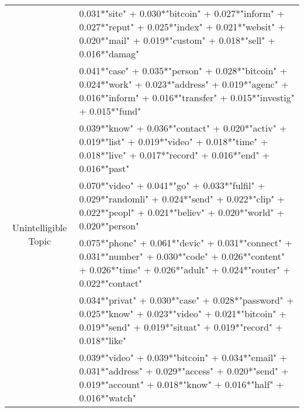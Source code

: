 \begin{table*}[]
\begin{tabularx}{\textwidth}{|c|X|}
& 0.031*"site" + 0.030*"bitcoin" + 0.027*"inform" + 0.027*"reput" + 0.025*"index" + 0.021*"websit" + 0.020*"mail" + 0.019*"custom" + 0.018*"sell" + 0.016*"damag" \\ \cline{2-2}
&  0.041*"case" + 0.035*"person" + 0.028*"bitcoin" + 0.024*"work" + 0.023*"address" + 0.019*"agenc" + 0.016*"inform" + 0.016*"transfer" + 0.015*"investig" + 0.015*"fund" 
\\ \hline                     
\multirow{4}{*}{Unintelligible Topic} & 0.039*"know" + 0.036*"contact" + 0.020*"activ" + 0.019*"list" + 0.019*"video" + 0.018*"time" + 0.018*"live" + 0.017*"record" + 0.016*"end" + 0.016*"past"\\ \cline{2-2}
&  0.070*"video" + 0.041*"go" + 0.033*"fulfil" + 0.029*"randomli" + 0.024*"send" + 0.022*"clip" + 0.022*"peopl" + 0.021*"believ" + 0.020*"world" + 0.020*"person"\\ \cline{2-2}
& 0.075*"phone" + 0.061*"devic" + 0.031*"connect" + 0.031*"number" + 0.030*"code" + 0.026*"content" + 0.026*"time" + 0.026*"adult" + 0.024*"router" + 0.022*"contact"\\ \cline{2-2}
& 0.034*"privat" + 0.030*"case" + 0.028*"password" + 0.025*"know" + 0.023*"video" + 0.021*"bitcoin" + 0.019*"send" + 0.019*"situat" + 0.019*"record" + 0.018*"like"\\ \cline{2-2}

&  0.039*"video" + 0.039*"bitcoin" + 0.034*"email" + 0.031*"address" + 0.029*"access" + 0.020*"send" + 0.019*"account" + 0.018*"know" + 0.016*"half" + 0.016*"watch" \\ \hline
\end{tabularx}
\end{table*}